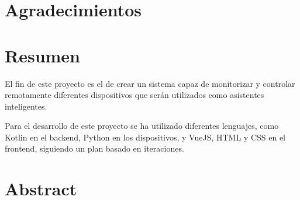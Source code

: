 \documentclass[openright,twoside,10pt]{book}
\begin{document}
\chapter*{Agradecimientos} %


\chapter*{Resumen} %
\begin{flushleft}

El fin de este proyecto es el de crear un sistema capaz de monitorizar y controlar remotamente diferentes dispositivos que serán utilizados como asistentes inteligentes.

Para el desarrollo de este proyecto se ha utilizado diferentes lenguajes, como Kotlin en el backend, Python en los dispositivos, y VueJS, HTML y CSS en el frontend, siguiendo un plan basado en iteraciones.


\end{flushleft}

\chapter*{Abstract} %
\begin{flushleft}


\end{flushleft}

\tableofcontents %

\cleardoublepage
{} %
\listoffigures %

\cleardoublepage
{} %
\listoftables %
\end{document}
